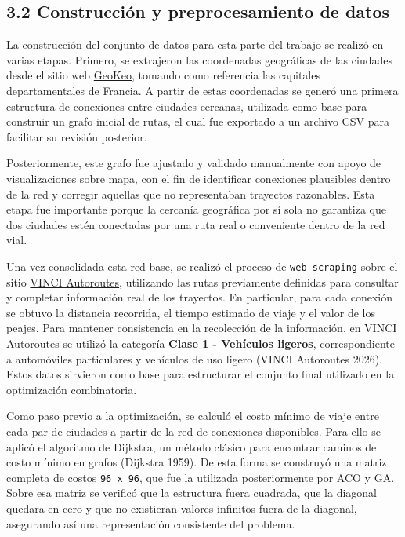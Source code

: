 \documentclass[
  12pt,
  letterpaper,
  DIV=11,
  numbers=noendperiod]{scrartcl}
\begin{document}
\subsection{3.2 Construcción y preprocesamiento de
datos}\label{construcciuxf3n-y-preprocesamiento-de-datos}

La construcción del conjunto de datos para esta parte del trabajo se
realizó en varias etapas. Primero, se extrajeron las coordenadas
geográficas de las ciudades desde el sitio web
\href{https://geokeo.com/database/town/fr/23/}{GeoKeo}, tomando como
referencia las capitales departamentales de Francia. A partir de estas
coordenadas se generó una primera estructura de conexiones entre
ciudades cercanas, utilizada como base para construir un grafo inicial
de rutas, el cual fue exportado a un archivo CSV para facilitar su
revisión posterior.

Posteriormente, este grafo fue ajustado y validado manualmente con apoyo
de visualizaciones sobre mapa, con el fin de identificar conexiones
plausibles dentro de la red y corregir aquellas que no representaban
trayectos razonables. Esta etapa fue importante porque la cercanía
geográfica por sí sola no garantiza que dos ciudades estén conectadas
por una ruta real o conveniente dentro de la red vial.

Una vez consolidada esta red base, se realizó el proceso de
\texttt{web\ scraping} sobre el sitio
\href{https://www.vinci-autoroutes.com/fr/mon-trajet/}{VINCI
Autoroutes}, utilizando las rutas previamente definidas para consultar y
completar información real de los trayectos. En particular, para cada
conexión se obtuvo la distancia recorrida, el tiempo estimado de viaje y
el valor de los peajes. Para mantener consistencia en la recolección de
la información, en VINCI Autoroutes se utilizó la categoría
\textbf{Clase 1 - Vehículos ligeros}, correspondiente a automóviles
particulares y vehículos de uso ligero (VINCI Autoroutes 2026). Estos
datos sirvieron como base para estructurar el conjunto final utilizado
en la optimización combinatoria.

Como paso previo a la optimización, se calculó el costo mínimo de viaje
entre cada par de ciudades a partir de la red de conexiones disponibles.
Para ello se aplicó el algoritmo de Dijkstra, un método clásico para
encontrar caminos de costo mínimo en grafos (Dijkstra 1959). De esta
forma se construyó una matriz completa de costos \texttt{96\ x\ 96}, que
fue la utilizada posteriormente por ACO y GA. Sobre esa matriz se
verificó que la estructura fuera cuadrada, que la diagonal quedara en
cero y que no existieran valores infinitos fuera de la diagonal,
asegurando así una representación consistente del problema.
\end{document}
